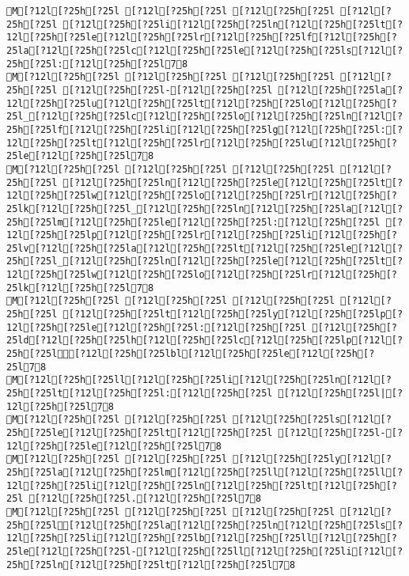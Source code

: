 \documentclass{scrartcl}
\begin{document}
\begin{Verbatim}
M[?12l[?25h[?25l [?12l[?25h[?25l [?12l[?25h[?25l [?12l[?25h[?25l [?12l[?25h[?25li[?12l[?25h[?25ln[?12l[?25h[?25lt[?12l[?25h[?25le[?12l[?25h[?25lr[?12l[?25h[?25lf[?12l[?25h[?25la[?12l[?25h[?25lc[?12l[?25h[?25le[?12l[?25h[?25ls[?12l[?25h[?25l:[?12l[?25h[?25l78
M[?12l[?25h[?25l [?12l[?25h[?25l [?12l[?25h[?25l [?12l[?25h[?25l [?12l[?25h[?25l-[?12l[?25h[?25l [?12l[?25h[?25la[?12l[?25h[?25lu[?12l[?25h[?25lt[?12l[?25h[?25lo[?12l[?25h[?25l_[?12l[?25h[?25lc[?12l[?25h[?25lo[?12l[?25h[?25ln[?12l[?25h[?25lf[?12l[?25h[?25li[?12l[?25h[?25lg[?12l[?25h[?25l:[?12l[?25h[?25lt[?12l[?25h[?25lr[?12l[?25h[?25lu[?12l[?25h[?25le[?12l[?25h[?25l78
M[?12l[?25h[?25l [?12l[?25h[?25l [?12l[?25h[?25l [?12l[?25h[?25l [?12l[?25h[?25ln[?12l[?25h[?25le[?12l[?25h[?25lt[?12l[?25h[?25lw[?12l[?25h[?25lo[?12l[?25h[?25lr[?12l[?25h[?25lk[?12l[?25h[?25l_[?12l[?25h[?25ln[?12l[?25h[?25la[?12l[?25h[?25lm[?12l[?25h[?25le[?12l[?25h[?25l:[?12l[?25h[?25l [?12l[?25h[?25lp[?12l[?25h[?25lr[?12l[?25h[?25li[?12l[?25h[?25lv[?12l[?25h[?25la[?12l[?25h[?25lt[?12l[?25h[?25le[?12l[?25h[?25l_[?12l[?25h[?25ln[?12l[?25h[?25le[?12l[?25h[?25lt[?12l[?25h[?25lw[?12l[?25h[?25lo[?12l[?25h[?25lr[?12l[?25h[?25lk[?12l[?25h[?25l78
M[?12l[?25h[?25l [?12l[?25h[?25l [?12l[?25h[?25l [?12l[?25h[?25l [?12l[?25h[?25lt[?12l[?25h[?25ly[?12l[?25h[?25lp[?12l[?25h[?25le[?12l[?25h[?25l:[?12l[?25h[?25l [?12l[?25h[?25ld[?12l[?25h[?25lh[?12l[?25h[?25lc[?12l[?25h[?25lp[?12l[?25h[?25l[?12l[?25h[?25lbl[?12l[?25h[?25le[?12l[?25h[?25l78
M[?12l[?25h[?25ll[?12l[?25h[?25li[?12l[?25h[?25ln[?12l[?25h[?25lt[?12l[?25h[?25l:[?12l[?25h[?25l [?12l[?25h[?25l|[?12l[?25h[?25l78
M[?12l[?25h[?25l [?12l[?25h[?25l [?12l[?25h[?25ls[?12l[?25h[?25le[?12l[?25h[?25lt[?12l[?25h[?25l [?12l[?25h[?25l-[?12l[?25h[?25le[?12l[?25h[?25l78
M[?12l[?25h[?25l [?12l[?25h[?25l [?12l[?25h[?25ly[?12l[?25h[?25la[?12l[?25h[?25lm[?12l[?25h[?25ll[?12l[?25h[?25ll[?12l[?25h[?25li[?12l[?25h[?25ln[?12l[?25h[?25lt[?12l[?25h[?25l [?12l[?25h[?25l.[?12l[?25h[?25l78
M[?12l[?25h[?25l [?12l[?25h[?25l [?12l[?25h[?25l [?12l[?25h[?25l[?12l[?25h[?25la[?12l[?25h[?25ln[?12l[?25h[?25ls[?12l[?25h[?25li[?12l[?25h[?25lb[?12l[?25h[?25ll[?12l[?25h[?25le[?12l[?25h[?25l-[?12l[?25h[?25ll[?12l[?25h[?25li[?12l[?25h[?25ln[?12l[?25h[?25lt[?12l[?25h[?25l78

\end{Verbatim}
\end{document}
